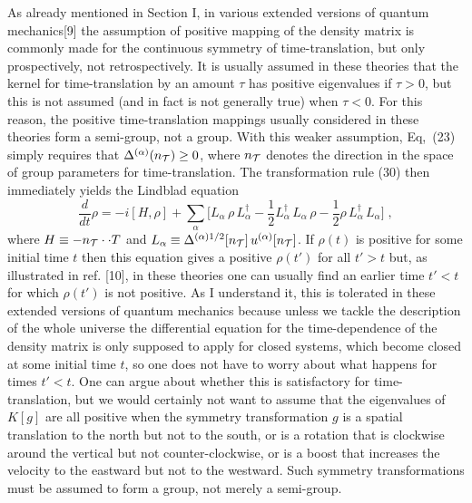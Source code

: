 \documentclass[12pt]{article}
\begin{document}
As already mentioned in Section I,  in various extended versions of quantum mechanics[9] the assumption of positive mapping of the density matrix  is commonly made for the continuous symmetry of time-translation, but only prospectively, not retrospectively.  It is usually assumed in these theories that  the kernel  for time-translation by an amount $\tau$ has positive eigenvalues if $\tau>0$, but this is not assumed (and in fact is not generally true)  when $\tau<0$.  For this reason, the positive time-translation mappings usually considered in these theories form a  semi-group, not a group. 
With this weaker assumption, Eq,~(23) simply requires that $\Delta^{(\alpha)}(n_{\cal T})\geq 0$, where $n_{\cal T}$ denotes the direction in the space of  group parameters for time-translation.  The transformation rule (30) then immediately yields the Lindblad equation  
$$
\frac{d}{dt}\rho=-i[H,\rho]+\sum_\alpha\Bigg[L_\alpha\,\rho\, L_\alpha^\dagger-\frac{1}{2}L_\alpha^\dagger \,L_\alpha\,\rho-\frac{1}{2}\rho \,L_\alpha^\dagger\, L_\alpha\Bigg]\;,
$$
where $H\equiv -n_{\cal T}\cdot \cdot T$ and $L_\alpha\equiv \Delta^{(\alpha)1/2}[n_{\cal T}]\,u^{(\alpha)}[n_{\cal T}]$.
If $\rho(t)$ is positive for some initial time $t$ then this equation gives a positive $\rho(t')$ for all $t'>t$ but, as illustrated in  ref. [10], in these theories one can usually find an earlier time $t'<t$ for which $
\rho(t')$  is not positive.    As I understand it, this is tolerated in these extended versions of quantum mechanics because unless we tackle the description of the whole universe the differential equation for the time-dependence of the density matrix is only supposed to apply for closed systems, which become closed at some initial time $t$, so one does not have to worry about what happens for times $t'<t$.   
One can argue about whether this is satisfactory for time-translation, but we would certainly not want to assume that the eigenvalues of $K[g]$ are all positive when  the symmetry transformation $g$ is a spatial translation to the north but not to the south, or is a rotation that is clockwise around the vertical but not counter-clockwise, or is a boost that increases the velocity to the eastward but not to the westward.  Such symmetry transformations must be assumed to form a group, not merely a semi-group.  
\end{document}
